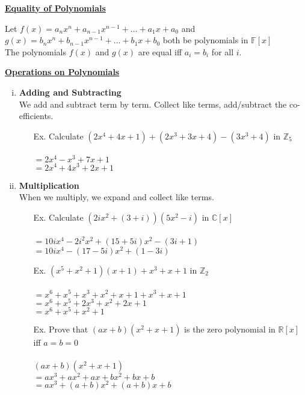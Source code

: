 \documentclass{letter}
\begin{document}
	\underline{\textbf{Equality of Polynomials}}
	
	Let $f(x) = a_nx^n + a_{n-1} x^{n-1} + \dots + a_1 x + a_0$ and $g(x) = b_nx^n + b_{n-1} x^{n-1} + \dots + b_1 x + b_0$ both be polynomials in $\mathbb{F}\left[ x \right]$\\
	The polynomials $f(x)$ and $g(x)$ are equal iff $a_i = b_i$ for all $i$.
	
	\underline{\textbf{Operations on Polynomials}}
	\begin{enumerate}[i)]
		\item \textbf{Adding and Subtracting}\\
		We add and subtract term by term. Collect like terms, add/subtract the co-efficients.
		
		\begin{itemize}
			\item[Ex. ] Calculate $(2x^4 + 4x + 1) + (2x^3 + 3x + 4) - (3x^3 + 4)$ in $\mathbb{Z}_5$\\\\
			$= 2x^4 - x^3 + 7x + 1$\\
			$= 2x^4 + 4x^3 + 2x + 1$
		\end{itemize}
		\item \textbf{Multiplication}\\
		When we multiply, we expand and collect like terms.
		
		\begin{itemize}
			\item[Ex. ] Calculate $(2ix^2 + (3+i))(5x^2 - i)$ in $\mathbb{C} \left[ x \right]$\\\\
			$= 10ix^4 - 2i^2x^2 + (15+5i)x^2 - (3i+1)$\\
			$= 10ix^4 - (17-5i)x^2 + (1-3i)$
			
			\item[Ex. ] $(x^5 + x^2 + 1)(x + 1) + x^3 + x + 1$ in $\mathbb{Z}_2$\\\\
			$= x^6 + x^5 + x^3 + x^2 + x + 1 + x^3 + x + 1$\\
			$= x^6 + x^5 + 2x^3 + x^2 + 2x + 1$\\
			$= x^6 + x^5 + x^2 + 1$
			
			\item[Ex. ] Prove that $(ax + b)(x^2 + x + 1)$ is the zero polynomial in $\mathbb{R} \left[ x \right]$ iff $a = b = 0$\\\\
			$(ax + b)(x^2+x+1)$\\
			$= ax^3 + ax^2 + ax + bx^2 + bx + b$\\
			$= ax^3 + (a+b)x^2 + (a+b)x + b$\\
			

\end{itemize}
\end{enumerate}
\end{document}
